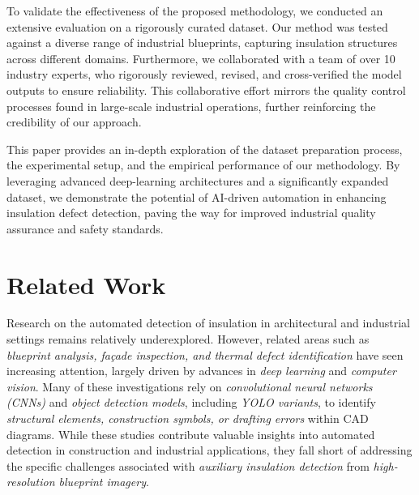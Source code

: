 \documentclass[]{IEEEphot}
\begin{document}
To validate the effectiveness of the proposed methodology, we conducted an extensive evaluation on a rigorously curated dataset. Our method was tested against a diverse range of industrial blueprints, capturing insulation structures across different domains. Furthermore, we collaborated with a team of over 10 industry experts, who rigorously reviewed, revised, and cross-verified the model outputs to ensure reliability. This collaborative effort mirrors the quality control processes found in large-scale industrial operations, further reinforcing the credibility of our approach.

This paper provides an in-depth exploration of the dataset preparation process, the experimental setup, and the empirical performance of our methodology. By leveraging advanced deep-learning architectures and a significantly expanded dataset, we demonstrate the potential of AI-driven automation in enhancing insulation defect detection, paving the way for improved industrial quality assurance and safety standards.


\section{Related Work}

Research on the automated detection of insulation in architectural and industrial settings remains relatively underexplored. However, related areas such as \textit{blueprint analysis, façade inspection, and thermal defect identification} have seen increasing attention, largely driven by advances in \textit{deep learning} and \textit{computer vision}. Many of these investigations rely on \textit{convolutional neural networks (CNNs)} and \textit{object detection models}, including \textit{YOLO variants}, to identify \textit{structural elements, construction symbols, or drafting errors} within CAD diagrams. While these studies contribute valuable insights into automated detection in construction and industrial applications, they fall short of addressing the specific challenges associated with \textit{auxiliary insulation detection} from \textit{high-resolution blueprint imagery}.  
\end{document}
